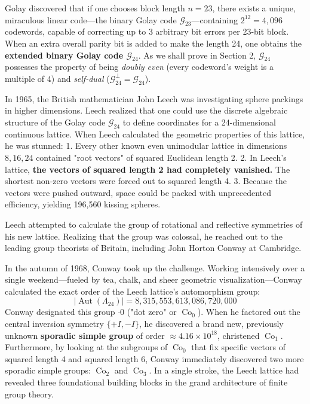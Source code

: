 \documentclass[11pt,twoside,openright]{amsbook}
\begin{document}
Golay discovered that if one chooses block length $n = 23$, there exists a unique, miraculous linear code—the binary Golay code $\mathcal{G}_{23}$—containing $2^{12} = 4,096$ codewords, capable of correcting up to 3 arbitrary bit errors per 23-bit block. When an extra overall parity bit is added to make the length 24, one obtains the \textbf{extended binary Golay code $\mathcal{G}_{24}$}. As we shall prove in Section 2, $\mathcal{G}_{24}$ possesses the property of being \textit{doubly even} (every codeword's weight is a multiple of 4) and \textit{self-dual} ($\mathcal{G}_{24}^\perp = \mathcal{G}_{24}$).

In 1965, the British mathematician John Leech was investigating sphere packings in higher dimensions. Leech realized that one could use the discrete algebraic structure of the Golay code $\mathcal{G}_{24}$ to define coordinates for a 24-dimensional continuous lattice. When Leech calculated the geometric properties of this lattice, he was stunned:
1. Every other known even unimodular lattice in dimensions $8, 16, 24$ contained "root vectors" of squared Euclidean length 2.
2. In Leech's lattice, \textbf{the vectors of squared length 2 had completely vanished.} The shortest non-zero vectors were forced out to squared length 4.
3. Because the vectors were pushed outward, space could be packed with unprecedented efficiency, yielding 196,560 kissing spheres.

Leech attempted to calculate the group of rotational and reflective symmetries of his new lattice. Realizing that the group was colossal, he reached out to the leading group theorists of Britain, including John Horton Conway at Cambridge.

In the autumn of 1968, Conway took up the challenge. Working intensively over a single weekend—fueled by tea, chalk, and sheer geometric visualization—Conway calculated the exact order of the Leech lattice's automorphism group:
$$|\operatorname{Aut}(\Lambda_{24})| = 8,315,553,613,086,720,000$$
Conway designated this group \textbf{$\cdot 0$} ("dot zero" or $\operatorname{Co}_0$). When he factored out the central inversion symmetry $\{+I, -I\}$, he discovered a brand new, previously unknown \textbf{sporadic simple group} of order $\approx 4.16 \times 10^{18}$, christened \textbf{$\operatorname{Co}_1$}. Furthermore, by looking at the subgroups of $\operatorname{Co}_0$ that fix specific vectors of squared length 4 and squared length 6, Conway immediately discovered two more sporadic simple groups: \textbf{$\operatorname{Co}_2$} and \textbf{$\operatorname{Co}_3$}. In a single stroke, the Leech lattice had revealed three foundational building blocks in the grand architecture of finite group theory.
\end{document}
